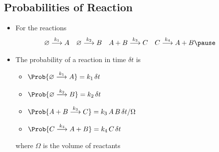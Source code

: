 \begin{slide}
\section{Probabilities of Reaction}

\begin{PauseHighLight}
  \begin{itemize}
  \item For the reactions
    \begin{align*}
      \varnothing &\goesto{k_1} A  &
      \varnothing &\goesto{k_2} B & 
       A + B &\goesto{k_3} C &
       C &\goesto{k_4} A + B\pause
    \end{align*}
  \item The probability of a reaction in time $\delta t$ is
    \begin{itemize}
    \item $\Prob{\varnothing \goesto{k_1} A} = k_1\,\delta t$
    \item $\Prob{\varnothing \goesto{k_2} B} = k_2\,\delta t$
    \item $\Prob{A + B \goesto{k_3} C} = k_3\,A\,B\,\delta t/\Omega$
    \item $\Prob{C \goesto{k_4} A + B} = k_4\,C\,\delta t$
    \end{itemize}
    where $\Omega$ is the volume of reactants\pause
  \end{itemize}
\end{PauseHighLight}

\end{slide}





